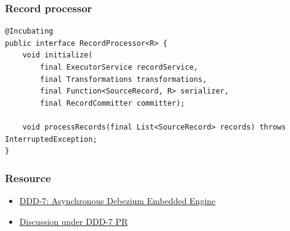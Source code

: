 \documentclass[10pt,utf8]{beamer}
\begin{document}
\begin{frame}[fragile]
    \frametitle{Record processor}
    \begin{lstlisting}[style=java]
@Incubating
public interface RecordProcessor<R> {
    void initialize(
        final ExecutorService recordService,
        final Transformations transformations,
        final Function<SourceRecord, R> serializer,
        final RecordCommitter committer);

    void processRecords(final List<SourceRecord> records) throws InterruptedException;
}
    \end{lstlisting}
\end{frame}


\begin{frame}
    \frametitle{Resource}
    \begin{itemize}
        \color{blue}
        \item \href{https://github.com/debezium/debezium-design-documents/blob/main/DDD-7.md}{DDD-7: Asynchronous Debezium Embedded Engine}
        \item \href{https://github.com/debezium/debezium-design-documents/pull/8}{Discussion under DDD-7 PR}
        \color{black}
    \end{itemize}
\end{frame}



\end{document}

